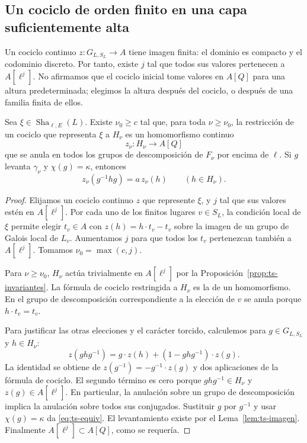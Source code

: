 \subsection{Un cociclo de orden finito en una capa suficientemente alta}

Un cociclo continuo $z:G_{L,S_L}\to A$ tiene imagen finita: el dominio es compacto y el codominio discreto. Por tanto, existe $j$ tal que todos sus valores pertenecen a $A[\ell^j]$. No afirmamos que el cociclo inicial tome valores en $A[Q]$ para una altura predeterminada; elegimos la altura después del cociclo, o después de una familia finita de ellos.

\begin{proposicion}
\label{prop:ts-realizacion}
Sea $\xi\in\operatorname{Sha}_{\ell,E}(L)$. Existe $\nu_0\ge c$ tal que, para toda $\nu\ge\nu_0$, la restricción de un cociclo que representa $\xi$ a $H_\nu$ es un homomorfismo continuo
\begin{equation}
 z_\nu:H_\nu\longrightarrow A[Q]
 \label{eq:ts-znu}
\end{equation}
que se anula en todos los grupos de descomposición de $F_\nu$ por encima de $\ell$. Si $g$ levanta $\gamma_\nu$ y $\chi(g)=\kappa$, entonces
\begin{equation}
 z_\nu(g^{-1}hg)=a\,z_\nu(h)\qquad(h\in H_\nu).
 \label{eq:ts-equiv}
\end{equation}
\end{proposicion}
\begin{proof}
Elijamos un cociclo continuo $z$ que represente $\xi$, y $j$ tal que sus valores estén en $A[\ell^j]$. Por cada uno de los finitos lugares $v\in S_L$, la condición local de $\xi$ permite elegir $t_v\in A$ con $z(h)=h\cdot t_v-t_v$ sobre la imagen de un grupo de Galois local de $L_v$. Aumentamos $j$ para que todos los $t_v$ pertenezcan también a $A[\ell^j]$. Tomamos $\nu_0=\max(c,j)$.

Para $\nu\ge\nu_0$, $H_\nu$ actúa trivialmente en $A[\ell^j]$ por la Proposición~\ref{prop:ts-invariantes}. La fórmula de cociclo restringida a $H_\nu$ es la de un homomorfismo. En el grupo de descomposición correspondiente a la elección de $v$ se anula porque $h\cdot t_v=t_v$.

Para justificar las otras elecciones y el carácter torcido, calculemos para $g\in G_{L,S_L}$ y $h\in H_\nu$:
\begin{equation}
 z(ghg^{-1})=g\cdot z(h)+(1-ghg^{-1})\cdot z(g).
 \label{eq:ts-conj}
\end{equation}
La identidad se obtiene de $z(g^{-1})=-g^{-1}\cdot z(g)$ y dos aplicaciones de la fórmula de cociclo. El segundo término es cero porque $ghg^{-1}\in H_\nu$ y $z(g)\in A[\ell^j]$. En particular, la anulación sobre un grupo de descomposición implica la anulación sobre todos sus conjugados. Sustituir $g$ por $g^{-1}$ y usar $\chi(g)=\kappa$ da \eqref{eq:ts-equiv}. El levantamiento existe por el Lema~\ref{lem:ts-imagen}. Finalmente $A[\ell^j]\subset A[Q]$, como se requería.
\end{proof}

